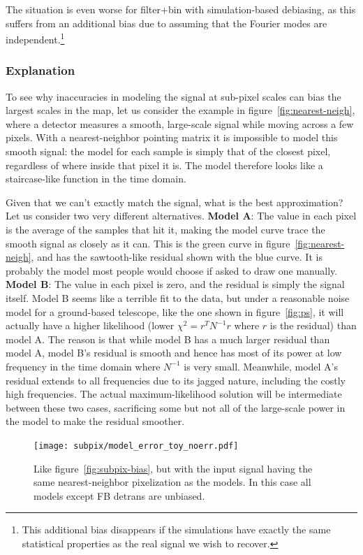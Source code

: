 \documentclass[twocolumn,apj]{aastex63}
\newcommand{\dfn}[1]{\textbf{#1}}
\begin{document}
The situation is even worse for filter+bin with simulation-based debiasing,
as this suffers from an additional bias due to assuming that the Fourier modes
are independent.\footnote{This additional bias disappears if the simulations
have exactly the same statistical properties as the real signal we wish to
recover.}

\subsubsection{Explanation}
To see why inaccuracies in modeling the signal at sub-pixel scales can bias
the largest scales in the map, let us consider the example in figure~\ref{fig:nearest-neigh},
where a detector measures a smooth, large-scale signal while moving across a few
pixels. With a nearest-neighbor pointing matrix it is impossible to model this
smooth signal: the model for each sample is simply that of the closest pixel,
regardless of where inside that pixel it is. The model therefore looks like
a staircase-like function in the time domain.

Given that we can't exactly match the signal, what is the best approximation?
Let us consider two very different alternatives. \dfn{Model A}: The value in each pixel
is the average of the samples that hit it, making the model curve trace the
smooth signal as closely as it can. This is the green curve in figure~\ref{fig:nearest-neigh},
and has the sawtooth-like residual shown with the blue curve. It is probably the
model most people would choose if asked to draw one manually.
\dfn{Model B}: The value in each pixel is zero, and the residual is simply the signal itself.
Model B seems like a terrible fit to the data, but under a reasonable noise model
for a ground-based telescope, like the one shown in figure~\ref{fig:ps}, it
will actually have a higher likelihood (lower $\chi^2 = r^TN^{-1}r$
where $r$ is the residual) than model A. The reason is that while model B has a much
larger residual than model A, model B's residual is smooth and hence has most of its
power at low frequency in the time domain where $N^{-1}$ is very small. Meanwhile, model A's
residual extends to all frequencies due to its jagged nature, including the costly high
frequencies. The actual maximum-likelihood solution will be intermediate between these
two cases, sacrificing some but not all of the large-scale power in the model to make
the residual smoother.

\begin{figure}
	\centering
	\hspace*{-5mm}\texttt{[image: subpix/model\_error\_toy\_noerr.pdf]}
	\caption{
		Like figure~\ref{fig:subpix-bias}, but with the input signal
		having the same nearest-neighbor pixelization as the models.
		In this case all models except FB detrans are unbiased.
	}
	\label{fig:subpix-noerr}
\end{figure}
\end{document}
